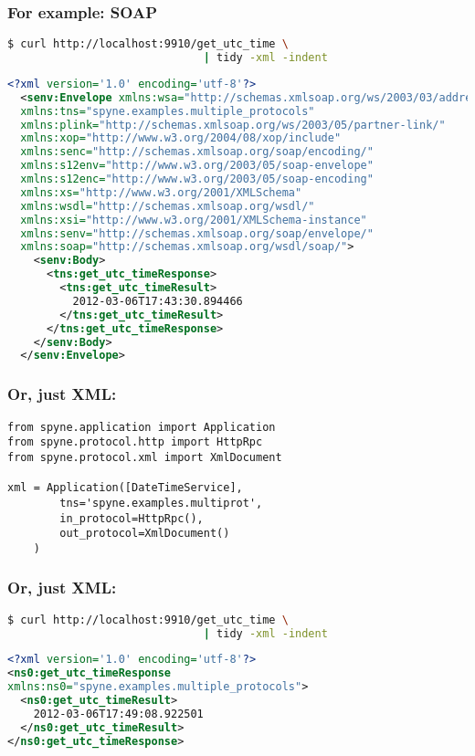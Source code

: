\documentclass{beamer}
\begin{document}
\begin{frame}[fragile]
  \frametitle{For example: SOAP}

  \begin{lstlisting}[language=sh,frame=topline]
$ curl http://localhost:9910/get_utc_time \
                              | tidy -xml -indent
  \end{lstlisting}
  \tiny
  \begin{lstlisting}[language=xml,frame=bottomline]
  <?xml version='1.0' encoding='utf-8'?>
  <senv:Envelope xmlns:wsa="http://schemas.xmlsoap.org/ws/2003/03/addressing"
  xmlns:tns="spyne.examples.multiple_protocols"
  xmlns:plink="http://schemas.xmlsoap.org/ws/2003/05/partner-link/"
  xmlns:xop="http://www.w3.org/2004/08/xop/include"
  xmlns:senc="http://schemas.xmlsoap.org/soap/encoding/"
  xmlns:s12env="http://www.w3.org/2003/05/soap-envelope"
  xmlns:s12enc="http://www.w3.org/2003/05/soap-encoding"
  xmlns:xs="http://www.w3.org/2001/XMLSchema"
  xmlns:wsdl="http://schemas.xmlsoap.org/wsdl/"
  xmlns:xsi="http://www.w3.org/2001/XMLSchema-instance"
  xmlns:senv="http://schemas.xmlsoap.org/soap/envelope/"
  xmlns:soap="http://schemas.xmlsoap.org/wsdl/soap/">
    <senv:Body>
      <tns:get_utc_timeResponse>
        <tns:get_utc_timeResult>
          2012-03-06T17:43:30.894466
        </tns:get_utc_timeResult>
      </tns:get_utc_timeResponse>
    </senv:Body>
  </senv:Envelope>
  \end{lstlisting}
\end{frame}

\begin{frame}[fragile]
  \frametitle{Or, just XML:}

  \begin{lstlisting}
from spyne.application import Application
from spyne.protocol.http import HttpRpc
from spyne.protocol.xml import XmlDocument

xml = Application([DateTimeService],
        tns='spyne.examples.multiprot',
        in_protocol=HttpRpc(),
        out_protocol=XmlDocument()
    )
  \end{lstlisting}
\end{frame}


\begin{frame}[fragile]
  \frametitle{Or, just XML:}

  \begin{lstlisting}[language=sh,frame=topline]
$ curl http://localhost:9910/get_utc_time \
                              | tidy -xml -indent
  \end{lstlisting}
  \small
  \begin{lstlisting}[language=xml,frame=bottomline]
<?xml version='1.0' encoding='utf-8'?>
<ns0:get_utc_timeResponse
xmlns:ns0="spyne.examples.multiple_protocols">
  <ns0:get_utc_timeResult>
    2012-03-06T17:49:08.922501
  </ns0:get_utc_timeResult>
</ns0:get_utc_timeResponse>
  \end{lstlisting}
\end{frame}
\end{document}
